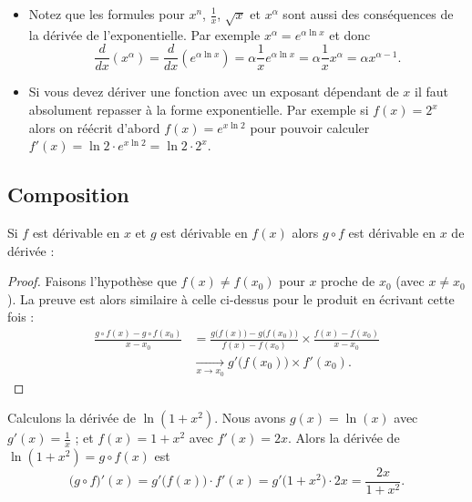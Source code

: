 \documentclass[class=report,crop=false]{standalone}
\begin{document}
\begin{remarque*}
\sauteligne
\begin{itemize}
  \item Notez que les formules pour $x^n$, $\frac 1x$, $\sqrt x$ et $x^\alpha$
sont aussi des conséquences de la dérivée de l'exponentielle.
Par exemple $x^\alpha = e^{\alpha \ln x}$ et donc
$$\frac{d }{dx}(x^\alpha) = \frac{d}{dx} (e^{\alpha \ln x}) = \alpha \frac{1}{x} e^{\alpha \ln x} =\alpha \frac 1x x^{\alpha}=\alpha x^{\alpha-1}.$$

  \item Si vous devez dériver une fonction avec un exposant dépendant de $x$ il faut absolument
repasser à la forme exponentielle.
Par exemple si $f(x)= 2^x$ alors on réécrit d'abord $f(x)=e^{x\ln 2}$ pour pouvoir calculer
$f'(x)=\ln 2 \cdot  e^{x\ln 2} = \ln 2  \cdot 2^x$.
\end{itemize}

\end{remarque*}




\subsection{Composition}

\begin{proposition}
Si $f$ est dérivable en $x$ et $g$ est dérivable en $f(x)$ alors $g\circ f$ est
dérivable en $x$ de dérivée :
\end{proposition}

\begin{proof}
Faisons l'hypothèse que $f(x) \neq f(x_0)$ pour $x$ proche de $x_0$ (avec $x \neq x_0$). 
La preuve est alors similaire à celle ci-dessus pour le produit en écrivant cette fois :
\begin{align*}
\frac{g\circ f(x)-g\circ f(x_0)}{x-x_0} 
&= \frac{g\big( f(x)\big)-g\big( f(x_0)\big)}{f(x)-f(x_0)} \times \frac{f(x)-f(x_0)}{x-x_0} \\
&\xrightarrow[x\to x_0]{} g'\big(f(x_0)\big) \times f'(x_0).
\end{align*}
\end{proof}


\begin{exemple}
Calculons la dérivée de $\ln(1+x^2)$. Nous avons $g(x)=\ln(x)$ avec $g'(x) = \frac 1x$ ; et
 $f(x)=1+x^2$ avec $f'(x) = 2x$.
Alors la dérivée de $\ln(1+x^2)=g\circ f(x)$ est
$$\big( g \circ f \big)'(x) = g'\big( f(x) \big) \cdot f'(x) = g'\big( 1+x^2 \big) \cdot 2x = \frac{2x}{1+x^2}.$$
\end{exemple}
\end{document}
